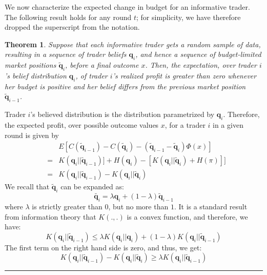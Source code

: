 \documentclass{article}
\newcommand{\qvec}{\mathbf{q}}
\newtheorem{theorem}{Theorem}
\newcommand{\qed}{\hfill\rule{7pt}{7pt}}
\newenvironment{proof}{\noindent{\bf Proof:}}{\qed\medskip}
\begin{document}
We now characterize the expected change in budget for an informative trader. The following result holds for any round $t$; for simplicity, we have therefore dropped the superscript from the notation.
\begin{theorem}\label{thm:growth}
 Suppose that each informative trader gets a random sample of data, 
resulting in a sequence of trader beliefs $\qvec_i$, and hence a sequence of budget-limited market positions
$\tilde{\qvec}_i$, before a final outcome $x$. Then, the expectation, over trader $i$'s belief distribution $\qvec_i$, of trader $i$'s realized profit is greater than zero whenever her budget is positive and her belief differs from the previous market position $\tilde{\qvec}_{i-1}$. 
\end {theorem}
\begin{proof}
Trader $i$'s believed distribution is the distribution parametrized by $\qvec_i$.
Therefore, the expected profit, over possible outcome values $x$, for a trader $i$ in a given round is given by
\begin{eqnarray*}
&& E[C(\tilde{\qvec}_{i-1})-C(\tilde{\qvec}_{i})-(\tilde{\qvec}_{i-1}-\tilde{\qvec}_{i})\Phi(x)]\\
&=& K(\qvec_{i}||\tilde{\qvec}_{i-1})] + H(\qvec_{i}) - [K(\qvec_{i}||\tilde{\qvec}_{i}) + H(\pi)]]\\
&=& K(\qvec_{i}||\tilde{\qvec}_{i-1}) - K(\qvec_{i}||\tilde{\qvec}_{i})
\end{eqnarray*}
We recall that $\tilde{\qvec}_{i}$ can be expanded as:
$$\tilde{\qvec_{i}} = \lambda \qvec_{i} + (1- \lambda) \tilde{\qvec}_{i-1}$$ where $\lambda$ is strictly greater than $0$, but no more than $1$. It is a standard result from information theory that $K(.,.)$ is a convex function, and therefore, we have:
\[
K(\qvec_{i}||\tilde{\qvec}_{i-1}) \leq \lambda K(\qvec_{i}||\qvec_{i}) + (1-\lambda) K(\qvec_{i}||\tilde{\qvec}_{i-1})
\]
The first term on the right hand side is zero, and thus, we get:
\[
  K(\qvec_{i}||\tilde{\qvec}_{i-1}) - K(\qvec_{i}||\tilde{\qvec}_{i}) \geq \lambda K(\qvec_{i}||\tilde{\qvec}_{i-1})
\]
 \end{proof}
\end{document}
